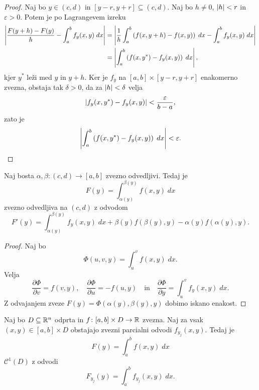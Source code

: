 \begin{proof}
Naj bo $y \in (c,d)$ in $[y-r,y+r] \subseteq (c,d)$. Naj bo
$h \ne 0$, $\left\lvert h\right\rvert < r$ in $\varepsilon > 0$. Potem je po
Lagrangevem izreku
\begin{align*}
\left\lvert \frac{F(y+h) - F(y)}{h} - \int_a^b f_y(x,y)\;dx\right\rvert &=
\left\lvert \frac{1}{h} \int_a^b \left(f(x,y+h) - f(x,y)\right)\;dx -
\int_a^b f_y(x,y)\;dx\right\rvert
\\
&= \left\lvert \int_a^b \left(f(x,y^*) - f_y(x,y)\right)\;dx\right\rvert,
\end{align*}
kjer $y^*$ leži med $y$ in $y+h$. Ker je $f_y$ na
$[a,b] \times [y-r,y+r]$ enakomerno zvezna, obstaja tak
$\delta > 0$, da za $\left\lvert h\right\rvert < \delta$ velja
\[
\left\lvert f_y(x,y^*) - f_y(x,y)\right\rvert < \frac{\varepsilon}{b-a},
\]
zato je
\[
\left\lvert \int_a^b \left(f(x,y^*) - f_y(x,y)\right)\;dx\right\rvert < \varepsilon.
\qedhere
\]
\end{proof}

\begin{posledica}
Naj bosta $\alpha,\beta \colon (c,d) \to [a,b]$ zvezno odvedljivi.
Tedaj je
\[
F(y) = \int_{\alpha(y)}^{\beta(y)} f(x,y)\;dx
\]
zvezno odvedljiva na $(c,d)$ z odvodom
\[
F'(y) = \int_{\alpha(y)}^{\beta(y)} f_y(x,y)\;dx +
\beta(y) f(\beta(y),y) - \alpha(y) f(\alpha(y),y).
\]
\end{posledica}

\begin{proof}
Naj bo
\[
\Phi(u,v,y) = \int_u^v f(x,y)\;dx.
\]
Velja
\[
\frac{\partial \Phi}{\partial v} = f(v,y),
\quad
\frac{\partial \Phi}{\partial u} = -f(u,y)
\quad \text{in} \quad
\frac{\partial \Phi}{\partial y} = \int_u^v f_y(x,y)\;dx.
\]
Z odvajanjem zveze $F(y) = \Phi(\alpha(y),\beta(y),y)$ dobimo
iskano enakost.
\end{proof}

\begin{posledica}
Naj bo $D \subseteq \mathbb{R}^n$ odprta in
$f \colon [a,b] \times D \to \mathbb{R}$ zvezna. Naj za vsak
$(x,y) \in [a,b] \times D$ obstajajo zvezni parcialni odvodi
$f_{y_j}(x,y)$. Tedaj je
\[
F(y) = \int_a^b f(x,y)\;dx
\]
$\mathcal{C}^1(D)$ z odvodi
\[
F_{y_j}(y) =  \int_a^b f_{y_j}(x,y)\;dx.
\]
\end{posledica}
